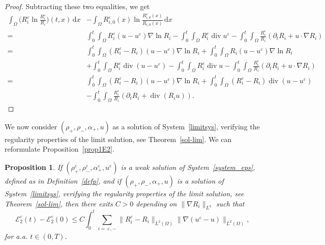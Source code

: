 \documentclass[11pt, twoside, a4paper]{article}
\theoremstyle{plain}
\newtheorem{proposition}[theorem]{Proposition}
\theoremstyle{remark}
\numberwithin{equation}{section}
\def\EE{{\mathcal E}}
\newcommand{\dd}{\,\mathrm{d}}
\renewcommand{\div}{\operatorname{div}}
\renewcommand{\leq}{\leqslant}\renewcommand{\le}{\leqslant}
\renewcommand{\epsilon}{\varepsilon}
\newcommand{\dt}{\partial_t}
\newcommand{\eps}{\varepsilon}
\begin{document}
\begin{proof}
Subtracting these two equalities, we get
\begin{align*}
 \int_\Omega \Big(R_i^\eps \ln \frac{R_i^\eps}{R_i}\Big)(t,x) \dd x &-\int_\Omega R_{i,0}^\eps(x) \ln \frac{R_{i,0}^\eps(x)}{R_{i,0}(x)} \dd x\\
 =& \int_0^t\!\!\! \int_\Omega R_i^\eps (u - u^\eps) \nabla \ln R_i - \int_0^t\!\!\! \int_\Omega R_i^\eps \div u^\eps - \int_0^t\!\!\! \int_\Omega \frac{R_i^\eps}{R_i} (\dt R_i + u \cdot \nabla R_i) \\
 =& \int_0^t\!\!\! \int_\Omega (R_i^\eps - R_i)(u - u^\eps) \nabla \ln R_i 
 + \int_0^t\!\!\! \int_\Omega R_i (u-u^\eps) \nabla \ln R_i \\
 &+ \int_0^t\!\!\! \int_\Omega R_i^\eps \div (u-u^\eps)-\int_0^t\!\!\! \int_\Omega R_i^\eps \div u- \int_0^t\!\!\! \int_\Omega \frac{R_i^\eps}{R_i} (\dt R_i + u \cdot \nabla R_i) \\
 =& \int_0^t\!\!\! \int_\Omega (R_i^\eps - R_i)(u - u^\eps) \nabla \ln R_i 
 + \int_0^t\!\!\! \int_\Omega (R_i^\eps - R_i) \div (u-u^\eps)\\
 &- \int_0^t\!\!\! \int_\Omega \frac{R_i^\eps}{R_i} (\dt R_i + \div ( R_iu)).
\end{align*}

\end{proof}




We now consider $(\rho_+,\rho_-,\alpha_+,u)$ as a solution of System~\eqref{limitsys}, verifying the regularity properties of the limit solution, see Theorem~\ref{sol-lim}. We can reformulate Proposition~\ref{prop1E2}.

\begin{proposition}\label{proprelR}
If $(\rho^{\epsilon}_+,\rho^{\epsilon}_-,\alpha^{\epsilon}_+,u^{\epsilon})$ is a weak solution of System~\eqref{system_eps}, defined as in Definition~\ref{defp}, and if $(\rho_+,\rho_-,\alpha_+,u)$ is a solution of System~\eqref{limitsys}, verifying the regularity properties of the limit solution, see Theorem~\ref{sol-lim}, then there exits $C>0$ depending on $\|\nabla R_i\|_{L^3}$ such that
\begin{equation*}
 \EE_2^\eps (t) - \EE_2^\eps(0) \leq 
 C \int_0^t \sum_{i=+,-}\| R_i^\eps - R_i\|_{L^2(\Omega)} \| \nabla (u^\eps -u)\|_{L^2(\Omega)} ,
\end{equation*}
for a.a. $t\in (0,T)$.
\end{proposition}
\end{document}
